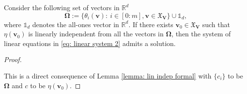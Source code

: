 \documentclass[accepted]{uai2022}
\newenvironment{customlem}[1]{\renewcommand\thelemma{#1}\lemma}{\endlemma}
\newenvironment{myproof}[1][\proofname]{%
  \begin{proof}[#1]$ $\nobreak\ignorespaces
}{%
  \end{proof}
}
\newcommand{\V}[0]{\mathbf{V}}
\newcommand{\dom}[1]{\mathfrak{X}_{#1}}
\begin{document}
    \begin{customlem}{\ref{lem: lin indep}}
        Consider the following set of vectors in $\mathbb{R}^d$
         \begin{equation} \label{eq: lin vectors apd}
            \mathbf{\Omega}:=\{\theta_{i}(\mathbf{v}):\ i\in [0:m], \mathbf{v}\in \dom{\V}\} \cup \mathds{1}_d,
        \end{equation}
        where $\mathds{1}_d$ denotes the all-ones vector in $\mathbb{R}^d$. 
        If there exists $\mathbf{v}_0 \in \dom{\V}$ such that $\eta(\mathbf{v}_0)$ is linearly independent from all the vectors in $\mathbf{\Omega}$, then the system of linear equations in \eqref{eq: linear system 2} admits a solution.
    \end{customlem}
    \begin{myproof}[Proof]
        This is a direct consequence of Lemma \ref{lemma: lin indep formal} with $\{c_i\}$ to be $\mathbf{\Omega}$ and $c$ to be $\eta(\mathbf{v}_0)$.
    \end{myproof}
    
\end{document}
